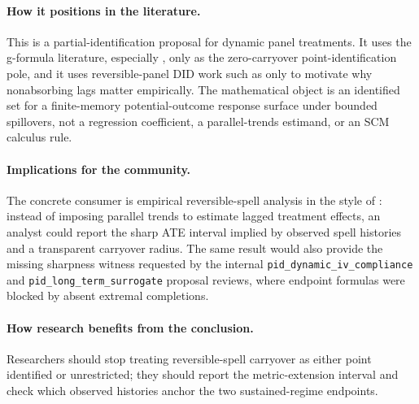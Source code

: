 \documentclass[11pt]{article}
\theoremstyle{definition}
\theoremstyle{plain}
\theoremstyle{remark}
\begin{document}
\paragraph{How it positions in the literature.}
This is a partial-identification proposal for dynamic panel treatments.  It uses the g-formula literature, especially \citet{Robins1986}, only as the zero-carryover point-identification pole, and it uses reversible-panel DID work such as \citet{DeChaisemartinDHaultfoeuille2024} only to motivate why nonabsorbing lags matter empirically.  The mathematical object is an identified set for a finite-memory potential-outcome response surface under bounded spillovers, not a regression coefficient, a parallel-trends estimand, or an SCM calculus rule.

\paragraph{Implications for the community.}
The concrete consumer is empirical reversible-spell analysis in the style of \citet{DeChaisemartinDHaultfoeuille2024}: instead of imposing parallel trends to estimate lagged treatment effects, an analyst could report the sharp ATE interval implied by observed spell histories and a transparent carryover radius.  The same result would also provide the missing sharpness witness requested by the internal \texttt{pid\_dynamic\_iv\_compliance} and \texttt{pid\_long\_term\_surrogate} proposal reviews, where endpoint formulas were blocked by absent extremal completions.

\paragraph{How research benefits from the conclusion.}
Researchers should stop treating reversible-spell carryover as either point identified or unrestricted; they should report the metric-extension interval and check which observed histories anchor the two sustained-regime endpoints.
\end{document}

